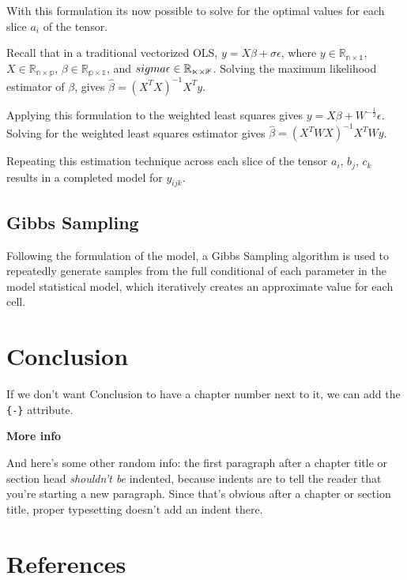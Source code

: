 \documentclass[12pt,twoside]{dukestatscithesis}
\theoremstyle{definition}
\theoremstyle{definition}
\theoremstyle{definition}
\theoremstyle{remark}
\begin{document}
With this formulation its now possible to solve for the optimal values
for each slice \(a_i\) of the tensor.

Recall that in a traditional vectorized OLS,
\(y = X\beta + \sigma\epsilon\), where
\(y \in \mathbb{R_{n \times 1}}\), \(X \in \mathbb{R_{n \times p}}\),
\(\beta \in \mathbb{R_{p \times 1}}\), and
\(\\sigma\epsilon \in \mathbb{R_{n \times 1}}\). Solving the maximum
likelihood estimator of \(\beta\), gives
\(\hat \beta = (X^TX)^{-1}X^Ty\).

Applying this formulation to the weighted least squares gives
\(y = X\beta + W^{-\frac{1}{2}}\epsilon\). Solving for the weighted
least squares estimator gives \(\hat \beta = (X^TWX)^{-1}X^TWy\).

Repeating this estimation technique across each slice of the tensor
\(a_i\), \(b_j\), \(c_k\) results in a completed model for \(y_{ijk}\).

\section{Gibbs Sampling}\label{gibbs-sampling}

Following the formulation of the model, a Gibbs Sampling algorithm is
used to repeatedly generate samples from the full conditional of each
parameter in the model statistical model, which iteratively creates an
approximate value for each cell.

\chapter*{Conclusion}\label{conclusion}

If we don't want Conclusion to have a chapter number next to it, we can
add the \texttt{\{-\}} attribute.

\textbf{More info}

And here's some other random info: the first paragraph after a chapter
title or section head \emph{shouldn't be} indented, because indents are
to tell the reader that you're starting a new paragraph. Since that's
obvious after a chapter or section title, proper typesetting doesn't add
an indent there.

\backmatter

\chapter*{References}\label{references}
\end{document}
